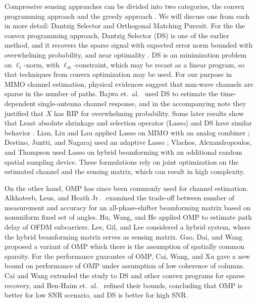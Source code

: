 \documentclass[journal]{IEEEtran}
\newcommand {\m} [1] {\( #1 \)}
\begin{document}
Compressive sensing approaches can be divided into two categories, the convex programming approach and the greedy approach \cite {RDD18}.
We will discuss one from each in more detail: Dantzig Selector and Orthogonal Matching Pursuit.
For the the convex programming approach, Dantzig Selector (DS) is one of the earlier method, and it recovers the sparse signal with expected error norm bounded with overwhelming probability, and near optimality \cite {CaT07}.
DS is an minimization problem on \m {\ell_1}-norm, with \m {\ell_\infty}-constraint, which may be recast as a linear program, so that techniques from convex optimization may be used.
For our purpose in MIMO channel estimation, physical evidences suggest that mm-wave channels are sparse in the number of paths.
Bajwa et.\ al.\ \cite {BHS10} used DS to estimate the time-dependent single-antenna channel response,
and in the accompanying note \cite {BHR08} they justified that \m {X} has RIP for overwhelming probability.
Some later results show that Least absolute shrinkage and selection operator (Lasso) and DS have similar behavior \cite {AsR10}.
Lian, Liu and Lau applied Lasso on MIMO with an analog combiner \cite {LLL17};
Destino, Juntti, and Nagaraj used an adaptive Lasso \cite {DJN15};
Vlachos, Alexandropoulos, and Thompson \cite {VAT19} used Lasso on hybrid beamforming with an additional random spatial sampling device.
These formulations rely on joint optimization on the estimated channel and the sensing matrix, which can result in high complexity.

On the other hand, OMP has since been commonly used for channel estimation.
Alkhateeb, Leus, and Heath Jr.\ \cite {ALH15} examined the trade-off between number of measurement and accuracy for an all-phase-shifter beamforming matrix based on nonuniform fixed set of angles.
Hu, Wang, and He \cite {HWH13} applied OMP to estimate path delay of OFDM subcarriers.
Lee, Gil, and Lee \cite {LGL16} considered a hybrid system, where the hybrid beamforming matrix serves as sensing matrix.
Gao, Dai, and Wang \cite {GDW15} proposed a variant of OMP which there is the assumption of spatially common sparsity.
For the performance guarantee of OMP, Cai, Wang, and Xu \cite {CWX10} gave a new bound on performance of OMP under assumption of low coherence of columns.
Cai and Wang \cite {CaW11} extended the study to DS and other convex programs for sparse recovery, and Ben-Haim et.\ al.\ \cite {BEE10} refined their bounds, concluding that OMP is better for low SNR scenario, and DS is better for high SNR.
\end{document}
